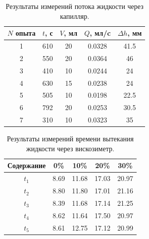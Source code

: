 \documentclass[a4paper,12pt]{report}
\begin{document}
        \begin{table}[H]
            \centering
            \begin{tabular}{|c|c|c|c|c|}
                \hline
                $N$ опыта & $t$, с & $V$, мл & $Q$, мл/c & $\Delta h$, мм \\
                \hline
                1 & 610 & 20 & 0.0328 & 41.5 \\
                \hline
                2 & 550 & 20 & 0.0364 & 46 \\
                \hline
                3 & 410 & 10 & 0.0244 & 24 \\
                \hline
                4 & 630 & 15 & 0.0238 & 24 \\
                \hline
                5 & 505 & 10 & 0.0198 & 22.5 \\
                \hline
                6 & 792 & 20 & 0.0253 & 30.5 \\
                \hline
                7 & 310 & 10 & 0.0323 & 35 \\
                \hline
            \end{tabular}
            \caption{Результаты измерений потока жидкости через капилляр.}
        \end{table}

        \begin{table}[H]
            \centering
            \begin{tabular}{|c|c|c|c|c|}
                \hline
                Содержание & 0\% & 10\% & 20\% & 30\% \\
                \hline
                $t_1$ & 8.69 & 11.68 & 17.03 & 20.97 \\
                \hline
                $t_2$ & 8.80 & 11.80 & 17.01 & 21.16 \\
                \hline
                $t_3$ & 8.39 & 11.68 & 17.14 & 21.25 \\
                \hline
                $t_4$ & 8.62 & 11.64 & 17.50 & 20.97 \\
                \hline
                $t_5$ & 8.61 & 12.75 & 17.12 & 20.99 \\
                \hline
            \end{tabular}
            \caption{Результаты измерений времени вытекания жидкости через вискозиметр.}
        \end{table}
\end{document}
